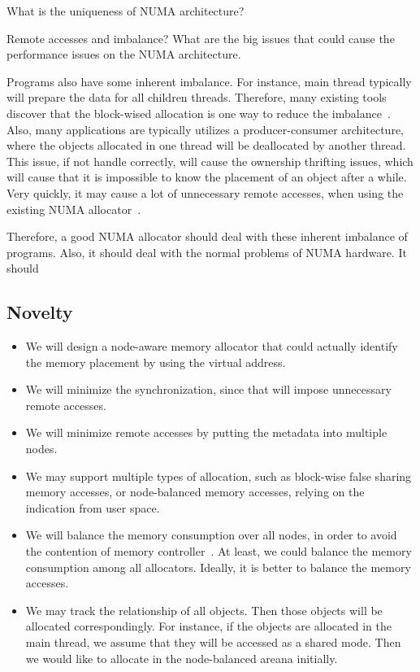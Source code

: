 
What is the uniqueness of NUMA architecture? 

Remote accesses and imbalance? 
What are the big issues that could cause the performance issues on the NUMA architecture. 

Programs also have some inherent imbalance. For instance, main thread typically will prepare the data for all children threads. Therefore, many existing tools discover that the block-wised allocation is one way to reduce the imbalance~\cite{XuNuma, XXX}. 
Also, many applications are typically utilizes a producer-consumer architecture, where the objects allocated in one thread will be deallocated by another thread. This issue, if not handle correctly, will cause the ownership thrifting issues, which will cause that it is impossible to know the placement of an object after a while. Very quickly, it may cause a lot of unnecessary remote accesses, when using the existing NUMA allocator~\cite{}.  

Therefore, a good NUMA allocator should deal with these inherent imbalance of programs. Also, it should deal with the normal problems of NUMA hardware. It should 

\subsection{Novelty}

\begin{itemize}
\item We will design a node-aware memory allocator that could actually identify the memory placement by using the virtual address.
\item We will minimize the synchronization, since that will impose unnecessary remote accesses. 
\item We will minimize remote accesses by putting the metadata into multiple nodes. 
\item We may support multiple types of allocation, such as block-wise false sharing memory accesses, or node-balanced memory accesses, relying on the indication from user space. 	
\item We will balance the memory consumption over all nodes, in order to avoid the contention of memory controller~\cite{Majo:2011:MSP:1987816.1987832}.  At least, we could balance the memory consumption among all allocators. Ideally, it is better to balance the memory accesses. 
\item We may track the relationship of all objects. Then those objects will be allocated correspondingly. For instance, if the objects are allocated in the main thread, we assume that they will be accessed as a shared mode. Then we would like to allocate in the node-balanced areana initially. 

\end{itemize}


